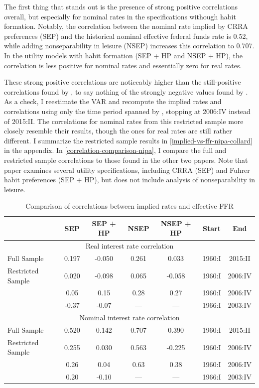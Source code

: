 The first thing that stands out is the presence of strong positive correlations overall, but especially for nominal rates in the specifications withough habit formation. Notably, the correlation between the nominal rate implied by CRRA preferences (SEP) and the historical nominal effective federal funds rate is 0.52, while adding nonseparability in leisure (NSEP) increases this correlation to 0.707. In the utility models with habit formation (SEP + HP and NSEP + HP), the correlation is less positive for nominal rates and essentially zero for real rates.

These strong positive correlations are noticeably higher than the still-positive correlations found by \cite{collard11}, to say nothing of the strongly negative values found by \cite{canzoneri07}. As a check, I reestimate the VAR and recompute the implied rates and correlations using only the time period spanned by \cite{collard11}, stopping at 2006:IV instead of 2015:II. The correlations for nominal rates from this restricted sample more closely resemble their results, though the ones for real rates are still rather different. I summarize the restricted sample results in \autoref{implied-vs-ffr-nipa-collard} in the appendix. In \autoref{correlation-comparison-nipa}, I compare the full and restricted sample correlations to those found in the other two papers. Note that \cite{canzoneri07} paper examines several utility specifications, including CRRA (SEP) and Fuhrer habit preferences (SEP + HP), but does not include analysis of nonseparability in leisure.

\begin{table}[t]
\centering
\caption{Comparison of correlations between implied rates and effective FFR}
\label{correlation-comparison-nipa}
\begin{tabular}{lcccccc} \hline
                   & SEP   & SEP + HP & NSEP  & NSEP + HP & Start  & End \\ \hline
\multicolumn{7}{c}{Real interest rate correlation} \\ \hline
Full Sample        & 0.197 & -0.050   & 0.261 & 0.033     & 1960:I & 2015:II \\
Restricted Sample  & 0.020 & -0.098   & 0.065 & -0.058    & 1960:I & 2006:IV \\
\cite{collard11}   & 0.05  & 0.15     & 0.28  & 0.27      & 1960:I & 2006:IV \\
\cite{canzoneri07} & -0.37 & -0.07    & ---   & ---       & 1966:I & 2003:IV \\ \hline
\multicolumn{7}{c}{Nominal interest rate correlation} \\ \hline
Full Sample        & 0.520 & 0.142    & 0.707 & 0.390     & 1960:I & 2015:II \\
Restricted Sample  & 0.255 & 0.030    & 0.563 & -0.225    & 1960:I & 2006:IV \\
\cite{collard11}   & 0.26  & 0.04     & 0.63  & 0.38      & 1960:I & 2006:IV \\
\cite{canzoneri07} & 0.20  & -0.10    & ---   & ---       & 1966:I & 2003:IV \\ \hline
\end{tabular}
\end{table}

